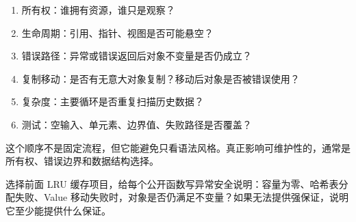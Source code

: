 \begin{enumerate}
  \item 所有权：谁拥有资源，谁只是观察？
  \item 生命周期：引用、指针、视图是否可能悬空？
  \item 错误路径：异常或错误返回后对象不变量是否仍成立？
  \item 复制移动：是否有无意大对象复制？移动后对象是否被错误使用？
  \item 复杂度：主要循环是否重复扫描历史数据？
  \item 测试：空输入、单元素、边界值、失败路径是否覆盖？
\end{enumerate}

这个顺序不是固定流程，但它能避免只看语法风格。真正影响可维护性的，通常是所有权、错误边界和数据结构选择。

\begin{exercisebox}
选择前面 LRU 缓存项目，给每个公开函数写异常安全说明：容量为零、哈希表分配失败、Value 移动失败时，对象是否仍满足不变量？如果无法提供强保证，说明它至少能提供什么保证。
\end{exercisebox}

